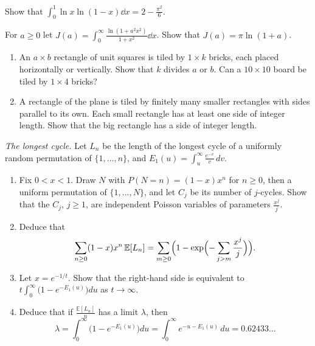 \begin{exercise}[$\star\star$]\label{ex:loglog}
Show that $\int_0^1\ln x\ln(1-x)\dd x=2-\frac{\pi^2}6$.
\end{exercise}

\begin{exercise}[$\star\star$]\label{ex:arctanparam}
For $a\ge0$ let
$J(a)=\int_0^\infty\frac{\ln(1+a^2x^2)}{1+x^2}\dd x$. Show that $J(a)=\pi\ln(1+a)$.
\end{exercise}

\begin{exercise}[$\star\star$]\label{pb:bricks}
\begin{enumerate}[label=(\alph*)]
\item An $a\times b$ rectangle of unit squares is tiled by $1\times k$ bricks, each placed horizontally or vertically.
Show that $k$ divides $a$ or $b$. Can a $10\times10$ board be tiled by $1\times4$ bricks?
\item A rectangle of the plane is tiled by finitely many smaller rectangles with sides parallel to its own. Each small
rectangle has at least one side of integer length. Show that the big rectangle has a side of integer length.
\end{enumerate}
\end{exercise}

\begin{exercise}[Journey]\label{pb:golomb}
\emph{The longest cycle.} Let $L_n$ be the length of the longest cycle of a uniformly random permutation of
$\{1,\dots,n\}$, and $E_1(u)=\int_u^\infty\frac{e^{-v}}v\,dv$.
\begin{enumerate}[label=(\alph*)]
\item Fix $0<x<1$. Draw $N$ with $P(N=n)=(1-x)x^n$ for $n\ge0$, then a uniform permutation of $\{1,\dots,N\}$, and let
$C_j$ be its number of $j$-cycles. Show that the $C_j$, $j\ge1$, are independent Poisson variables of parameters $\frac{x^j}j$.
\item Deduce that
\[
\sum_{n\ge0}(1-x)x^n\,\mathbb E[L_n]=\sum_{m\ge0}\Bigl(1-\exp\Bigl(-\sum_{j>m}\frac{x^j}j\Bigr)\Bigr).
\]
\item Let $x=e^{-1/t}$. Show that the right-hand side is equivalent to $t\int_0^\infty\bigl(1-e^{-E_1(u)}\bigr)du$ as
$t\to\infty$.
\item Deduce that if $\frac{\mathbb E[L_n]}n$ has a limit $\lambda$, then
\[
\lambda=\int_0^\infty\bigl(1-e^{-E_1(u)}\bigr)du=\int_0^\infty e^{-u-E_1(u)}\,du=0.62433\ldots
\]
\end{enumerate}
\end{exercise}

